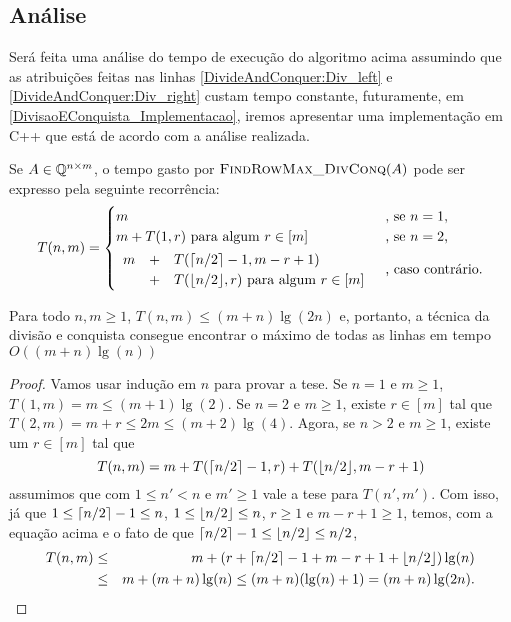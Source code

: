 \subsection{Análise}
Será feita uma análise do tempo de execução do algoritmo acima assumindo que as atribuições feitas nas linhas \ref{DivideAndConquer:Div_left} e \ref{DivideAndConquer:Div_right} custam tempo constante, futuramente, em \ref{DivisaoEConquista_Implementacao}, iremos apresentar uma implementação em C++ que está de acordo com a análise realizada.  

Se $A \in \mathbb{Q}^{n \times m}$, o tempo gasto por $\textsc{FindRowMax\_DivConq}(A)$ pode ser expresso pela seguinte recorrência:
\begin{equation*}
T(n,m) =
\begin{cases}
    m                                           & \text{, se } n = 1 \text{,} \\
    m + T(1,r) \text{ para algum } r \in [m]    & \text{, se } n = 2 \text{,} \\[2pt]
    \begin{array}{lll}
        m & + & T(\lceil n/2\rceil-1,m-r+1) \\
          & + & T(\lfloor n/2\rfloor,r) \text{ para algum } r \in [m] 
    \end{array}                                 & \text{, caso contrário.}
\end{cases}
\end{equation*}

\begin{prop}
Para todo $n,m \geq 1$, $T(n,m) \leq (m+n)\lg(2n)$ e, portanto, a técnica da divisão e conquista consegue encontrar o máximo de todas as linhas em tempo $O((m+n)\lg(n))$
\end{prop}

\begin{proof}
Vamos usar indução em $n$ para provar a tese. Se $n = 1$ e $m \geq 1$, $T(1,m) = m \leq (m+1)\lg(2)$. Se $n = 2$ e $m \geq 1$, existe $r \in [m]$ tal que $T(2,m) = m + r \leq 2m \leq (m+2)\lg(4)$. Agora, se $n > 2$ e $m \geq 1$, existe um $r \in [m]$ tal que 
$$ T(n,m) = m + T(\lceil n/2\rceil - 1, r) + T(\lfloor n/2\rfloor, m - r + 1) $$
assumimos que com $1 \leq n' < n$ e $m' \geq 1$ vale a tese para $T(n',m')$. Com isso, já que $1 \leq \lceil n/2\rceil-1 \leq n$, $1 \leq \lfloor n/2\rfloor \leq n$, $r \geq 1$ e $m - r + 1 \geq 1$, temos, com a equação acima e o fato de que $\lceil n/2\rceil-1 \leq \lfloor n/2\rfloor \leq n/2$,
\begin{align*} 
    T(n,m) & \leq & m + (r + \lceil n/2\rceil - 1 + m - r + 1 + \lfloor n/2\rfloor)\lg(n) \\
           & \leq & m + (m + n)\lg(n) \leq (m + n)(\lg(n) + 1) = (m + n)\lg(2n) \text{.}
\end{align*}
\end{proof}

